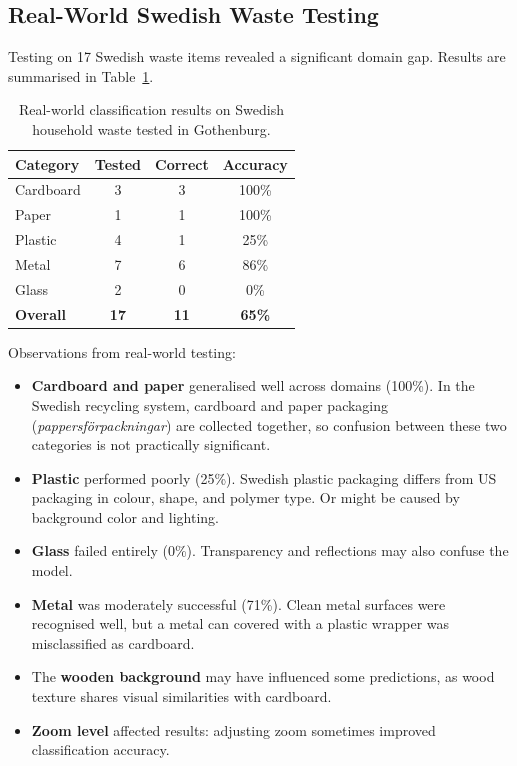 \documentclass[11pt,a4paper]{article}
\begin{document}
\subsection{Real-World Swedish Waste Testing}

Testing on 17 Swedish waste items revealed a significant domain gap. Results are summarised in Table~\ref{tab:realworld}.

\begin{table}[H]
\centering
\caption{Real-world classification results on Swedish household waste tested in Gothenburg.}
\label{tab:realworld}
\begin{tabular}{lccc}
\toprule
\textbf{Category} & \textbf{Tested} & \textbf{Correct} & \textbf{Accuracy} \\
\midrule
Cardboard & 3 & 3 & 100\% \\
Paper     & 1 & 1 & 100\% \\
Plastic   & 4 & 1 & 25\% \\
Metal     & 7 & 6 & 86\% \\
Glass     & 2 & 0 & 0\% \\
\midrule
\textbf{Overall} & \textbf{17} & \textbf{11} & \textbf{65\%} \\
\bottomrule
\end{tabular}
\end{table}

Observations from real-world testing:

\begin{itemize}
  \item \textbf{Cardboard and paper} generalised well across domains (100\%). In the Swedish recycling system, cardboard and paper packaging (\textit{pappersf\"{o}rpackningar}) are collected together, so confusion between these two categories is not practically significant.
  \item \textbf{Plastic} performed poorly (25\%). Swedish plastic packaging differs from US packaging in colour, shape, and polymer type. Or might be caused by background color and lighting.
  \item \textbf{Glass} failed entirely (0\%). Transparency and reflections may also confuse the model.
  \item \textbf{Metal} was moderately successful (71\%). Clean metal surfaces were recognised well, but a metal can covered with a plastic wrapper was misclassified as cardboard.
  \item The \textbf{wooden background} may have influenced some predictions, as wood texture shares visual similarities with cardboard.
  \item \textbf{Zoom level} affected results: adjusting zoom sometimes improved classification accuracy.
\end{itemize}
\end{document}
